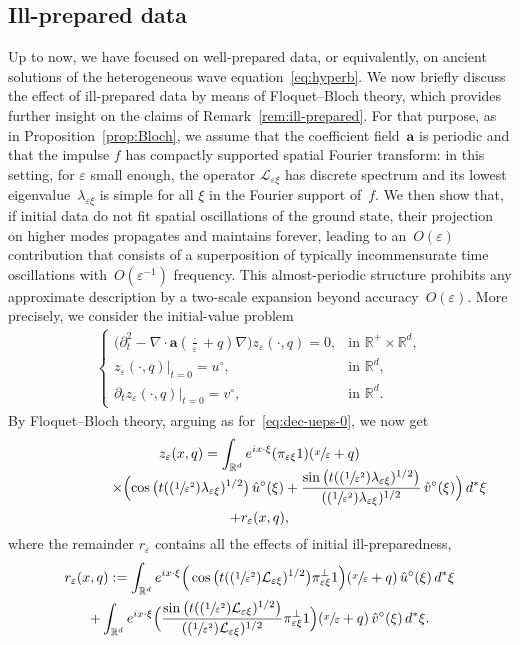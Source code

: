 \documentclass[10pt]{amsart}
\newcommand{\Psfrac}[2]{(\sfrac{#1}{#2})}
\theoremstyle{plain}
\theoremstyle{definition}
\numberwithin{equation}{section}
\newcommand{\e}{\varepsilon}
\newcommand{\Lc}{\mathcal{L}}
\newcommand{\R}{\mathbb R}
\newcommand{\Aa}{\boldsymbol a}
\begin{document}
\subsection{Ill-prepared data}\label{sec:ill-posed}
Up to now, we have focused on well-prepared data, or equivalently, on ancient solutions of the heterogeneous wave equation~\eqref{eq:hyperb}.
We now briefly discuss the effect of ill-prepared data by means of Floquet--Bloch theory, which provides further insight on the claims of Remark~\ref{rem:ill-prepared}.
For that purpose, as in Proposition~\ref{prop:Bloch}, we assume that the coefficient field~$\Aa$ is periodic and that the impulse $f$ has compactly supported spatial Fourier transform: in this setting, for $\e$ small enough, the operator $\Lc_{\e\xi}$ has discrete spectrum and its lowest eigenvalue~$\lambda_{\e\xi}$ is simple for all $\xi$ in the Fourier support of~$f$.
We then show that, if initial data do not fit spatial oscillations of the ground state,
their projection on higher modes propagates and maintains forever, leading to an~$O(\e)$ contribution that consists of a superposition of typically incommensurate time oscillations with~$O(\e^{-1})$ frequency. This almost-periodic structure prohibits any approximate description by a two-scale expansion beyond accuracy~$O(\e)$.
More precisely, we consider the initial-value problem
\begin{gather*}
\begin{cases}
\big(\partial_t^2-\nabla\cdot\Aa(\tfrac\cdot\e+q)\nabla\big)z_\e(\cdot,q)=0,&\text{in $\R^+\times\R^d$},\\
z_\e(\cdot,q)|_{t=0}=u^\circ,&\text{in $\R^d$},\\
\partial_tz_\e(\cdot,q)|_{t=0}=v^\circ,&\text{in $\R^d$}.
\end{cases}
\end{gather*}
By Floquet--Bloch theory, arguing as for~\eqref{eq:dec-ueps-0}, we now get
\begin{multline*}
z_\e(x,q)
=\int_{\R^d}e^{ix\cdot\xi}(\pi_{\e\xi}1)(\sfrac x\e+q)\\[-5pt]\hspace*{2cm}\times\Bigl(\cos\big(t(\Psfrac1{\e^2}\lambda_{\e\xi})^{1/2}\big)\,\hat u^\circ(\xi)+\frac{\sin\big(t(\Psfrac1{\e^2}\lambda_{\e\xi})^{1/2}\big)}{(\Psfrac1{\e^2}\lambda_{\e\xi})^{1/2}}\,\hat v^\circ(\xi)\Bigr)\,d^*\xi\\
+r_\e(x,q),
\end{multline*}
where the remainder $r_{\e}$ contains all the effects of initial ill-preparedness,
\begin{multline*}
r_\e(x,q):=\int_{\R^d}e^{ix\cdot\xi}\Big(\cos\big(t(\Psfrac1{\e^2}\Lc_{\e\xi})^{1/2}\big)\pi_{\e\xi}^\bot1\Big)(\sfrac x\e+q)\,\hat u^\circ(\xi)\,d^*\xi\\
+\int_{\R^d}e^{ix\cdot\xi}\Bigl(\frac{\sin\big(t(\Psfrac1{\e^2}\Lc_{\e\xi})^{1/2}\big)}{(\Psfrac1{\e^2}\Lc_{\e\xi})^{1/2}}\pi_{\e\xi}^\bot1\Bigr)(\sfrac x\e+q)\,\hat v^\circ(\xi)\,d^*\xi.
\end{multline*}
\end{document}
